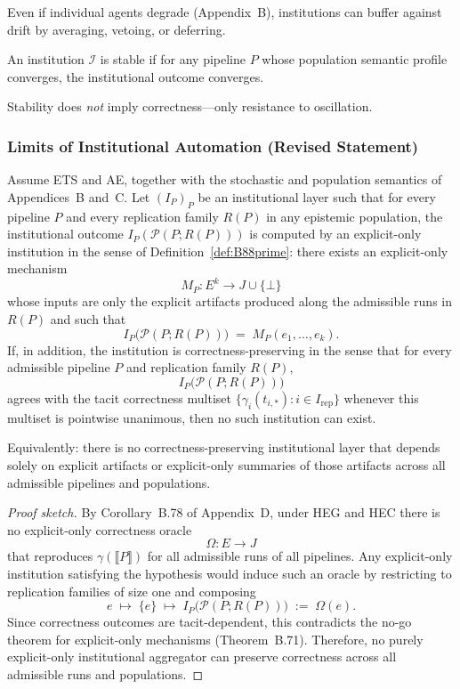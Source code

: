 Even if individual agents degrade (Appendix~B), institutions can buffer
against drift by averaging, vetoing, or deferring.

\begin{definition}
An institution $\mathcal{I}$ is stable if for any pipeline $P$ whose
population semantic profile converges, the institutional outcome converges.
\end{definition}

\begin{remark}
Stability does \emph{not} imply correctness—only resistance to oscillation.
\end{remark}

\subsubsection{Limits of Institutional Automation (Revised Statement)}
\label{sec:appendix-E6}

\begin{theorem}\label{thm:B93}
Assume ETS and AE, together with the stochastic and population semantics of Appendices~B and~C. Let $(I_P)_P$ be an institutional layer such that for every pipeline $P$ and every replication family $R(P)$ in any epistemic population, the institutional outcome $I_P(\mathcal{P}(P; R(P)))$ is computed by an explicit-only institution in the sense of Definition~\ref{def:B88prime}: there exists an explicit-only mechanism
\[
  M_P : E^k \to J \cup \{\bot\}
\]
whose inputs are only the explicit artifacts produced along the admissible runs in $R(P)$ and such that
\[
  I_P\bigl(\mathcal{P}(P; R(P))\bigr) \;=\; M_P(e_1, \dots, e_k).
\]
If, in addition, the institution is correctness-preserving in the sense that for every admissible pipeline $P$ and replication family $R(P)$,
\[
  I_P\bigl(\mathcal{P}(P; R(P))\bigr)
\]
agrees with the tacit correctness multiset $\{\gamma_i(t_{i,*}) : i \in I_{\mathrm{rep}}\}$ whenever this multiset is pointwise unanimous, then no such institution can exist.

Equivalently: there is no correctness-preserving institutional layer that depends solely on explicit artifacts or explicit-only summaries of those artifacts across all admissible pipelines and populations.
\end{theorem}

\begin{proof}[Proof sketch]
By Corollary~B.78 of Appendix~D, under HEG and HEC there is no explicit-only correctness oracle
\[
  \Omega : E \to J
\]
that reproduces $\gamma(\llbracket P \rrbracket)$ for all admissible runs of all pipelines. Any explicit-only institution satisfying the hypothesis would induce such an oracle by restricting to replication families of size one and composing
\[
  e \;\mapsto\; \{e\} \;\mapsto\; I_P\bigl(\mathcal{P}(P; R(P))\bigr) \;:=\; \Omega(e).
\]
Since correctness outcomes are tacit-dependent, this contradicts the no-go theorem for explicit-only mechanisms (Theorem~B.71). Therefore, no purely explicit-only institutional aggregator can preserve correctness across all admissible runs and populations.
\end{proof}


